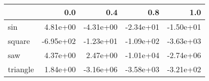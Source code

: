 \begin{tabular}{lrrrr}
\toprule
{} &       0.0 &       0.4 &       0.8 &       1.0 \\
\midrule
sin      &  4.81e+00 & -4.31e+00 & -2.34e+01 & -1.50e+01 \\
square   & -6.95e+02 & -1.23e+01 & -1.09e+02 & -3.63e+03 \\
saw      &  4.37e+00 &  2.47e+00 & -1.01e+04 & -2.74e+06 \\
triangle &  1.84e+00 & -3.16e+06 & -3.58e+03 & -3.21e+02 \\
\bottomrule
\end{tabular}
